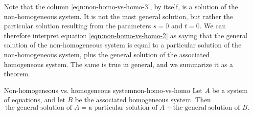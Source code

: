 Note that the column {\eqref{eqn:non-homo-vs-homo-3}}, by itself, is a
solution of the non-homogeneous system. It is not the most general
solution, but rather the particular solution resulting from the
parameters $s=0$ and $t=0$. We can therefore interpret equation
{\eqref{eqn:non-homo-vs-homo-2}} as saying that the general
solution of the non-homogeneous system is
equal to a particular solution of the
non-homogeneous system, plus the general solution of the associated
homogeneous system. The same is true in general, and we summarize it
as a theorem.

\begin{theorem}{Non-homogeneous vs. homogeneous system}{non-homo-vs-homo}
  Let $A$ be a system of equations, and let $B$ be the associated
  homogeneous system. Then
  \begin{equation*}
    \mbox{the general solution of $A$}
    = \mbox{a particular solution of $A$}
    + \mbox{the general solution of $B$}.
  \end{equation*}
\end{theorem}
